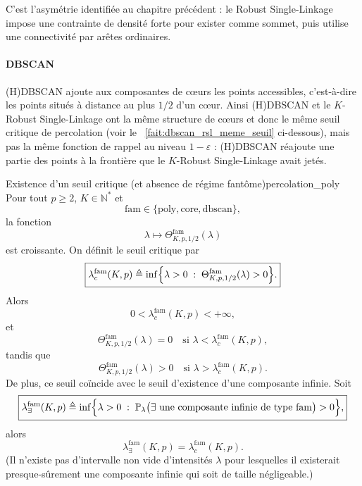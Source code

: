 C'est l'asymétrie identifiée au chapitre précédent : le Robust Single-Linkage impose une contrainte de densité forte pour exister comme sommet, puis utilise une connectivité par arêtes ordinaires.

\paragraph{DBSCAN}
(H)DBSCAN ajoute aux composantes de cœurs les points accessibles, c'est-à-dire les points situés à distance au plus $1/2$ d'un cœur. Ainsi (H)DBSCAN et le $K$-Robust Single-Linkage ont la même structure de cœurs et donc le même seuil critique de percolation (voir le \Fact~\ref{fait:dbscan_rsl_meme_seuil} ci-dessous), mais pas la même fonction de rappel au niveau $1-\varepsilon$ : (H)DBSCAN réajoute une partie des points à la frontière que le $K$-Robust Single-Linkage avait jetés.

\begin{Fait}{Existence d'un seuil critique (et absence de régime fantôme)}{percolation_poly}
Pour tout $p\geq 2$, $K\in\mathbb{N}^{\ast}$ et
\[
\mathrm{fam}\in\{\mathrm{poly},\mathrm{core},\mathrm{dbscan}\},
\]
la fonction
\[
\lambda\longmapsto
\Theta^{\mathrm{fam}}_{K,p,1/2}(\lambda)
\]
est croissante. On définit le seuil critique par
\[
\boxed{
    \lambda^{\mathrm{fam}}_{c}(K,p)
    \triangleq
    \inf\Bigl\{
    \lambda>0 \;:\;
    \Theta^{\mathrm{fam}}_{K,p,1/2}(\lambda)>0
    \Bigr\}.
}
\]
Alors
\[
\boxed{
    0<\lambda^{\mathrm{fam}}_{c}(K,p)<+\infty,
}
\]
et
\[
\Theta^{\mathrm{fam}}_{K,p,1/2}(\lambda)=0
\quad\text{si }\lambda<\lambda^{\mathrm{fam}}_{c}(K,p),
\]
tandis que
\[
\Theta^{\mathrm{fam}}_{K,p,1/2}(\lambda)>0
\quad\text{si }\lambda>\lambda^{\mathrm{fam}}_{c}(K,p).
\]
De plus, ce seuil coïncide avec le seuil d'existence d'une composante
infinie. Soit
\[
\boxed{
    \lambda^{\mathrm{fam}}_{\exists}(K,p)
    \triangleq
    \inf\Bigl\{
    \lambda>0 \;:\;
    \mathbb{P}_{\lambda}\bigl(
    \exists\text{ une composante infinie de type }\mathrm{fam}
    \bigr)>0
    \Bigr\},
}
\]
alors
\[
    \lambda^{\mathrm{fam}}_{\exists}(K,p) = \lambda^{\mathrm{fam}}_{c}(K,p).
\]
(Il n'existe pas d'intervalle non vide d'intensités $\lambda$ pour lesquelles il existerait presque-sûrement une composante infinie qui soit de taille négligeable.)
\end{Fait}

